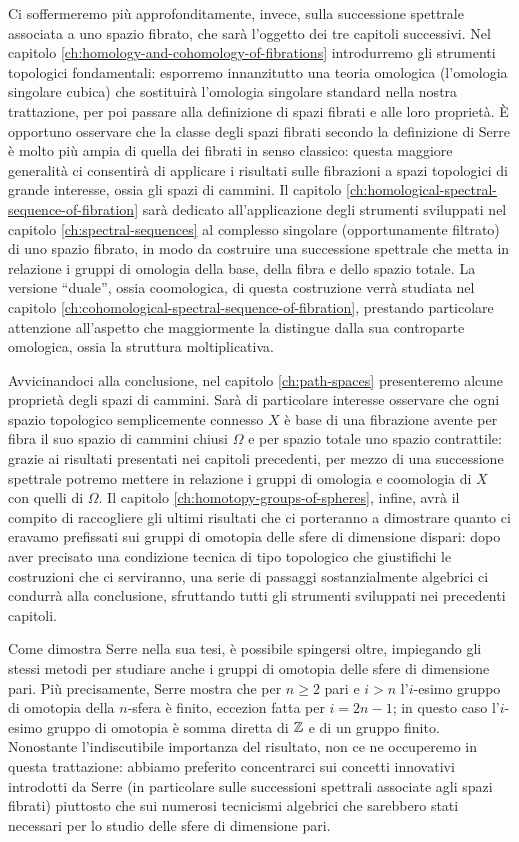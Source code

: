 Ci soffermeremo più approfonditamente, invece, sulla successione spettrale associata a uno spazio fibrato, che sarà l'oggetto dei tre capitoli successivi. Nel capitolo \ref{ch:homology-and-cohomology-of-fibrations} introdurremo gli strumenti topologici fondamentali: esporremo innanzitutto una teoria omologica (l'omologia singolare cubica) che sostituirà l'omologia singolare standard nella nostra trattazione, per poi passare alla definizione di spazi fibrati e alle loro proprietà. È opportuno osservare che la classe degli spazi fibrati secondo la definizione di Serre è molto più ampia di quella dei fibrati in senso classico: questa maggiore generalità ci consentirà di applicare i risultati sulle fibrazioni a spazi topologici di grande interesse, ossia gli spazi di cammini. Il capitolo \ref{ch:homological-spectral-sequence-of-fibration} sarà dedicato all'applicazione degli strumenti sviluppati nel capitolo \ref{ch:spectral-sequences} al complesso singolare (opportunamente filtrato) di uno spazio fibrato, in modo da costruire una successione spettrale che metta in relazione i gruppi di omologia della base, della fibra e dello spazio totale. La versione \enquote{duale}, ossia coomologica, di questa costruzione verrà studiata nel capitolo \ref{ch:cohomological-spectral-sequence-of-fibration}, prestando particolare attenzione all'aspetto che maggiormente la distingue dalla sua controparte omologica, ossia la struttura moltiplicativa.

Avvicinandoci alla conclusione, nel capitolo \ref{ch:path-spaces} presenteremo alcune proprietà degli spazi di cammini. Sarà di particolare interesse osservare che ogni spazio topologico semplicemente connesso \(X\) è base di una fibrazione avente per fibra il suo spazio di cammini chiusi \(\Omega\) e per spazio totale uno spazio contrattile: grazie ai risultati presentati nei capitoli precedenti, per mezzo di una successione spettrale potremo mettere in relazione i gruppi di omologia e coomologia di \(X\) con quelli di \(\Omega\). Il capitolo \ref{ch:homotopy-groups-of-spheres}, infine, avrà il compito di raccogliere gli ultimi risultati che ci porteranno a dimostrare quanto ci eravamo prefissati sui gruppi di omotopia delle sfere di dimensione dispari: dopo aver precisato una condizione tecnica di tipo topologico che giustifichi le costruzioni che ci serviranno, una serie di passaggi sostanzialmente algebrici ci condurrà alla conclusione, sfruttando tutti gli strumenti sviluppati nei precedenti capitoli.

Come dimostra Serre nella sua tesi, è possibile spingersi oltre, impiegando gli stessi metodi per studiare anche i gruppi di omotopia delle sfere di dimensione pari. Più precisamente, Serre mostra che per \(n\ge 2\) pari e \(i>n\) l'\(i\)-esimo gruppo di omotopia della \(n\)-sfera è finito, eccezion fatta per \(i=2n-1\); in questo caso l'\(i\)-esimo gruppo di omotopia è somma diretta di \(\mathbb{Z}\) e di un gruppo finito. Nonostante l'indiscutibile importanza del risultato, non ce ne occuperemo in questa trattazione: abbiamo preferito concentrarci sui concetti innovativi introdotti da Serre (in particolare sulle successioni spettrali associate agli spazi fibrati) piuttosto che sui numerosi tecnicismi algebrici che sarebbero stati necessari per lo studio delle sfere di dimensione pari.
